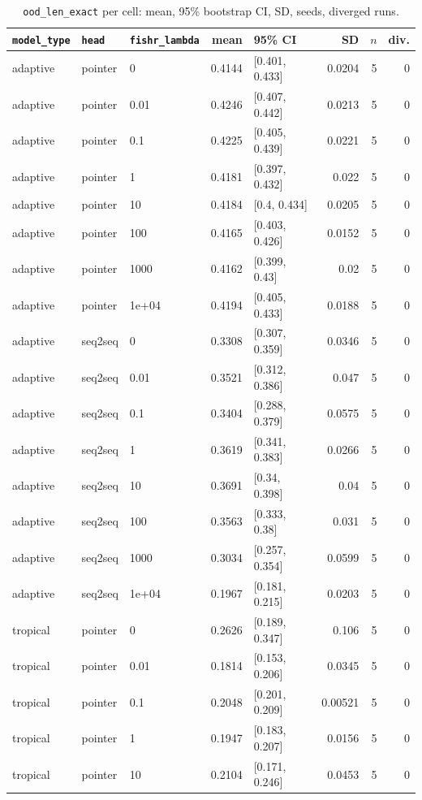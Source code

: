 \documentclass[10pt]{article}
\begin{document}
{\small
\begin{longtable}{lllrlrrr}
\caption{\texttt{ood\_len\_exact} per cell: mean, 95\% bootstrap CI, SD, seeds, diverged runs.}\label{tab:summary-ood_len_exact}\\
\toprule
\texttt{model\_type} & \texttt{head} & \texttt{fishr\_lambda} & mean & 95\% CI & SD & $n$ & div.\\
\midrule
\endhead
adaptive & pointer & 0 & 0.4144 & [0.401, 0.433] & 0.0204 & 5 & 0\\
adaptive & pointer & 0.01 & 0.4246 & [0.407, 0.442] & 0.0213 & 5 & 0\\
adaptive & pointer & 0.1 & 0.4225 & [0.405, 0.439] & 0.0221 & 5 & 0\\
adaptive & pointer & 1 & 0.4181 & [0.397, 0.432] & 0.022 & 5 & 0\\
adaptive & pointer & 10 & 0.4184 & [0.4, 0.434] & 0.0205 & 5 & 0\\
adaptive & pointer & 100 & 0.4165 & [0.403, 0.426] & 0.0152 & 5 & 0\\
adaptive & pointer & 1000 & 0.4162 & [0.399, 0.43] & 0.02 & 5 & 0\\
adaptive & pointer & 1e+04 & 0.4194 & [0.405, 0.433] & 0.0188 & 5 & 0\\
adaptive & seq2seq & 0 & 0.3308 & [0.307, 0.359] & 0.0346 & 5 & 0\\
adaptive & seq2seq & 0.01 & 0.3521 & [0.312, 0.386] & 0.047 & 5 & 0\\
adaptive & seq2seq & 0.1 & 0.3404 & [0.288, 0.379] & 0.0575 & 5 & 0\\
adaptive & seq2seq & 1 & 0.3619 & [0.341, 0.383] & 0.0266 & 5 & 0\\
adaptive & seq2seq & 10 & 0.3691 & [0.34, 0.398] & 0.04 & 5 & 0\\
adaptive & seq2seq & 100 & 0.3563 & [0.333, 0.38] & 0.031 & 5 & 0\\
adaptive & seq2seq & 1000 & 0.3034 & [0.257, 0.354] & 0.0599 & 5 & 0\\
adaptive & seq2seq & 1e+04 & 0.1967 & [0.181, 0.215] & 0.0203 & 5 & 0\\
tropical & pointer & 0 & 0.2626 & [0.189, 0.347] & 0.106 & 5 & 0\\
tropical & pointer & 0.01 & 0.1814 & [0.153, 0.206] & 0.0345 & 5 & 0\\
tropical & pointer & 0.1 & 0.2048 & [0.201, 0.209] & 0.00521 & 5 & 0\\
tropical & pointer & 1 & 0.1947 & [0.183, 0.207] & 0.0156 & 5 & 0\\
tropical & pointer & 10 & 0.2104 & [0.171, 0.246] & 0.0453 & 5 & 0\\

\end{longtable}}
\end{document}
